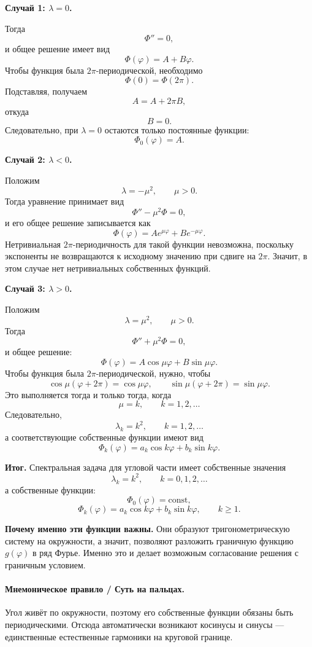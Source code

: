 \documentclass[a4paper,12pt]{article}
\begin{document}
\textbf{Случай 1: \texorpdfstring{$\lambda=0$}{lambda=0}.}

Тогда
\[
\Phi''=0,
\]
и общее решение имеет вид
\[
\Phi(\varphi)=A+B\varphi.
\]
Чтобы функция была $2\pi$-периодической, необходимо
\[
\Phi(0)=\Phi(2\pi).
\]
Подставляя, получаем
\[
A=A+2\pi B,
\]
откуда
\[
B=0.
\]
Следовательно, при $\lambda=0$ остаются только постоянные функции:
\[
\Phi_0(\varphi)=A.
\]

\textbf{Случай 2: \texorpdfstring{$\lambda<0$}{lambda<0}.}

Положим
\[
\lambda=-\mu^2,
\qquad \mu>0.
\]
Тогда уравнение принимает вид
\[
\Phi''-\mu^2\Phi=0,
\]
и его общее решение записывается как
\[
\Phi(\varphi)=A e^{\mu\varphi}+B e^{-\mu\varphi}.
\]
Нетривиальная $2\pi$-периодичность для такой функции невозможна, поскольку экспоненты не возвращаются к исходному значению при сдвиге на $2\pi$. Значит, в этом случае нет нетривиальных собственных функций.

\textbf{Случай 3: \texorpdfstring{$\lambda>0$}{lambda>0}.}

Положим
\[
\lambda=\mu^2,
\qquad \mu>0.
\]
Тогда
\[
\Phi''+\mu^2\Phi=0,
\]
и общее решение:
\[
\Phi(\varphi)=A\cos\mu\varphi+B\sin\mu\varphi.
\]
Чтобы функция была $2\pi$-периодической, нужно, чтобы
\[
\cos\mu(\varphi+2\pi)=\cos\mu\varphi,
\qquad
\sin\mu(\varphi+2\pi)=\sin\mu\varphi.
\]
Это выполняется тогда и только тогда, когда
\[
\mu=k,
\qquad
k=1,2,\dots
\]
Следовательно,
\[
\lambda_k=k^2,
\qquad
k=1,2,\dots
\]
а соответствующие собственные функции имеют вид
\[
\Phi_k(\varphi)=a_k\cos k\varphi+b_k\sin k\varphi.
\]

\textbf{Итог.}
Спектральная задача для угловой части имеет собственные значения
\[
\lambda_k=k^2,
\qquad
k=0,1,2,\dots
\]
а собственные функции:
\[
\Phi_0(\varphi)=\text{const},
\]
\[
\Phi_k(\varphi)=a_k\cos k\varphi+b_k\sin k\varphi,
\qquad
k\ge 1.
\]

\textbf{Почему именно эти функции важны.}
Они образуют тригонометрическую систему на окружности, а значит, позволяют разложить граничную функцию $g(\varphi)$ в ряд Фурье. Именно это и делает возможным согласование решения с граничным условием.

\paragraph{Мнемоническое правило / Суть на пальцах.}
Угол живёт по окружности, поэтому его собственные функции обязаны быть периодическими. Отсюда автоматически возникают косинусы и синусы --- единственные естественные гармоники на круговой границе.
\end{document}
